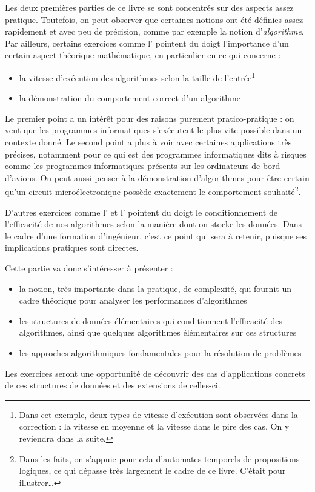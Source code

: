 \documentclass[../../main.tex]{subfiles}
\begin{document}
Les deux premières parties de ce livre se sont concentrés sur des aspects assez pratique. Toutefois, on peut observer que certaines notions ont été définies assez rapidement et avec peu de précision, comme par exemple la notion d'\textit{algorithme}. Par ailleurs, certains exercices comme l' pointent du doigt l'importance d'un certain aspect théorique mathématique, en particulier en ce qui concerne :
\begin{itemize}
	\item la vitesse d'exécution des algorithmes selon la taille de l'entrée\footnote{Dans cet exemple, deux types de vitesse d'exécution sont observées dans la correction : la vitesse en moyenne et la vitesse dans le pire des cas. On y reviendra dans la suite.}
	\item la démonstration du comportement correct d'un algorithme
\end{itemize}
Le premier point a un intérêt pour des raisons purement pratico-pratique : on veut que les programmes informatiques s'exécutent le plus vite possible dans un contexte donné. Le second point a plus à voir avec certaines applications très précises, notamment pour ce qui est des programmes informatiques dits \og à risques \fg comme les programmes informatiques présents sur les ordinateurs de bord d'avions. On peut aussi penser à la démonstration d'algorithmes pour être certain qu'un circuit microélectronique possède exactement le comportement souhaité\footnote{Dans les faits, on s'appuie pour cela d'automates temporels de propositions logiques, ce qui dépasse très largement le cadre de ce livre. C'était pour illustrer\dots}.

D'autres exercices comme l' et l' pointent du doigt le conditionnement de l'efficacité de nos algorithmes selon la manière dont on stocke les données. Dans le cadre d'une formation d'ingénieur, c'est ce point qui sera à retenir, puisque ses implications pratiques sont directes.

Cette partie va donc s'intéresser à présenter :
\begin{itemize}
	\item la notion, très importante dans la pratique, de complexité, qui fournit un cadre théorique pour analyser les performances d'algorithmes
	\item les structures de données élémentaires qui conditionnent l'efficacité des algorithmes, ainsi que quelques algorithmes élémentaires sur ces structures
	\item les approches algorithmiques fondamentales pour la résolution de problèmes
\end{itemize}
Les exercices seront une opportunité de découvrir des cas d'applications concrets de ces structures de données et des extensions de celles-ci.
\end{document}
